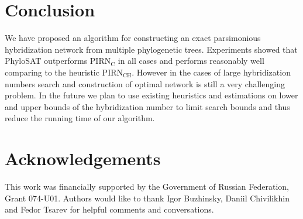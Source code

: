 \documentclass[runningheads, envcountsame, a4paper]{llncs}
\begin{document}
\section{Conclusion}

We have proposed an algorithm for constructing an exact parsimonious hybridization network from multiple phylogenetic trees.
Experiments showed that PhyloSAT outperforms PIRN$\mathrm{_C}$ in all cases and performs reasonably well comparing 
to the heuristic PIRN$\mathrm{_{CH}}$. 
However in the cases of large hybridization numbers search and construction of optimal network is still a very challenging problem. 
In the future we plan to use existing heuristics and estimations on lower and upper bounds of the hybridization number to 
limit search bounds and thus reduce the running time of our algorithm.

\section*{Acknowledgements}

This work was financially supported by the Government of Russian Federation, Grant 074-U01. Authors would like to thank Igor Buzhinsky, Daniil Chivilikhin and Fedor Tsarev for helpful comments and conversations.



\clearpage
\end{document}
